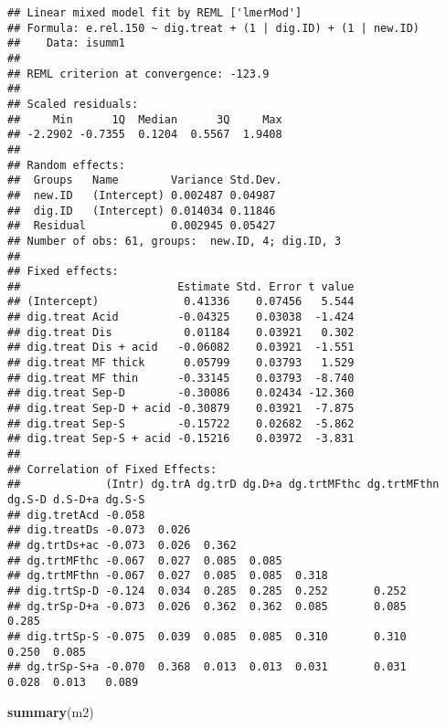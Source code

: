 \documentclass[
]{article}
\newenvironment{Shaded}{\begin{snugshade}}{\end{snugshade}}
\newcommand{\FunctionTok}[1]{\textcolor[rgb]{0.13,0.29,0.53}{\textbf{#1}}}
\newcommand{\NormalTok}[1]{#1}
\begin{document}
\begin{verbatim}
## Linear mixed model fit by REML ['lmerMod']
## Formula: e.rel.150 ~ dig.treat + (1 | dig.ID) + (1 | new.ID)
##    Data: isumm1
## 
## REML criterion at convergence: -123.9
## 
## Scaled residuals: 
##     Min      1Q  Median      3Q     Max 
## -2.2902 -0.7355  0.1204  0.5567  1.9408 
## 
## Random effects:
##  Groups   Name        Variance Std.Dev.
##  new.ID   (Intercept) 0.002487 0.04987 
##  dig.ID   (Intercept) 0.014034 0.11846 
##  Residual             0.002945 0.05427 
## Number of obs: 61, groups:  new.ID, 4; dig.ID, 3
## 
## Fixed effects:
##                        Estimate Std. Error t value
## (Intercept)             0.41336    0.07456   5.544
## dig.treat Acid         -0.04325    0.03038  -1.424
## dig.treat Dis           0.01184    0.03921   0.302
## dig.treat Dis + acid   -0.06082    0.03921  -1.551
## dig.treat MF thick      0.05799    0.03793   1.529
## dig.treat MF thin      -0.33145    0.03793  -8.740
## dig.treat Sep-D        -0.30086    0.02434 -12.360
## dig.treat Sep-D + acid -0.30879    0.03921  -7.875
## dig.treat Sep-S        -0.15722    0.02682  -5.862
## dig.treat Sep-S + acid -0.15216    0.03972  -3.831
## 
## Correlation of Fixed Effects:
##             (Intr) dg.trA dg.trD dg.D+a dg.trtMFthc dg.trtMFthn dg.S-D d.S-D+a dg.S-S
## dig.tretAcd -0.058                                                                   
## dig.treatDs -0.073  0.026                                                            
## dg.trtDs+ac -0.073  0.026  0.362                                                     
## dg.trtMFthc -0.067  0.027  0.085  0.085                                              
## dg.trtMFthn -0.067  0.027  0.085  0.085  0.318                                       
## dig.trtSp-D -0.124  0.034  0.285  0.285  0.252       0.252                           
## dg.trSp-D+a -0.073  0.026  0.362  0.362  0.085       0.085       0.285               
## dig.trtSp-S -0.075  0.039  0.085  0.085  0.310       0.310       0.250  0.085        
## dg.trSp-S+a -0.070  0.368  0.013  0.013  0.031       0.031       0.028  0.013   0.089
\end{verbatim}

\begin{Shaded}
\begin{Highlighting}[]
\FunctionTok{summary}\NormalTok{(m2)}
\end{Highlighting}
\end{Shaded}
\end{document}
